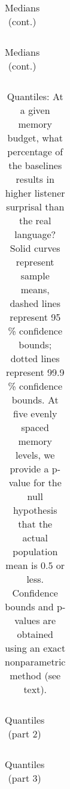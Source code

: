 \begin{table}
\begin{tabular}{ccccccccccccccclll}

\end{tabular}
	\caption{Medians (cont.)}
\end{table}

\begin{table}
\begin{tabular}{ccccccccccccccclll}

\end{tabular}
	\caption{Medians (cont.)}
\end{table}






\begin{table}
\begin{tabular}{cccccccccccccccccc}

\end{tabular}
	\caption{Quantiles: At a given memory budget, what percentage of the baselines results in higher listener surprisal than the real language? Solid curves represent sample means, dashed lines represent 95 \% confidence bounds; dotted lines represent 99.9 \% confidence bounds. At five evenly spaced memory levels, we provide a p-value for the null hypothesis that the actual population mean is $0.5$ or less. Confidence bounds and p-values are obtained using an exact nonparametric method (see text).}\label{tab:quantiles}
\end{table}

\begin{table}
\begin{tabular}{cccccccccccccccccc}

\end{tabular}
	\caption{Quantiles (part 2)}
\end{table}

\begin{table}
\begin{tabular}{cccccccccccccccccc}

\end{tabular}
	\caption{Quantiles (part 3)}
\end{table}




